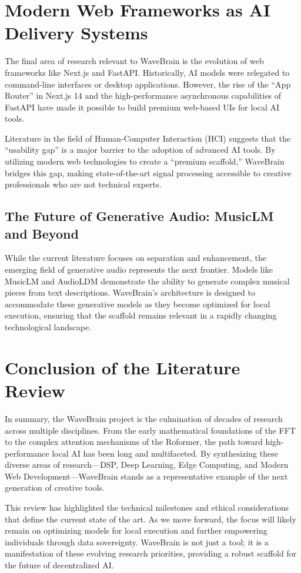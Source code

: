 \documentclass[12pt,a4paper]{article}
\begin{document}
\section{Modern Web Frameworks as AI Delivery Systems}
The final area of research relevant to WaveBrain is the evolution of web frameworks like Next.js and FastAPI. Historically, AI models were relegated to command-line interfaces or desktop applications. However, the rise of the ``App Router'' in Next.js 14 and the high-performance asynchronous capabilities of FastAPI have made it possible to build premium web-based UIs for local AI tools.

Literature in the field of Human-Computer Interaction (HCI) suggests that the ``usability gap'' is a major barrier to the adoption of advanced AI tools. By utilizing modern web technologies to create a ``premium scaffold,'' WaveBrain bridges this gap, making state-of-the-art signal processing accessible to creative professionals who are not technical experts.

\subsection{The Future of Generative Audio: MusicLM and Beyond}
While the current literature focuses on separation and enhancement, the emerging field of generative audio represents the next frontier. Models like MusicLM and AudioLDM demonstrate the ability to generate complex musical pieces from text descriptions. WaveBrain's architecture is designed to accommodate these generative models as they become optimized for local execution, ensuring that the scaffold remains relevant in a rapidly changing technological landscape.

\section{Conclusion of the Literature Review}
In summary, the WaveBrain project is the culmination of decades of research across multiple disciplines. From the early mathematical foundations of the FFT to the complex attention mechanisms of the Roformer, the path toward high-performance local AI has been long and multifaceted. By synthesizing these diverse areas of research---DSP, Deep Learning, Edge Computing, and Modern Web Development---WaveBrain stands as a representative example of the next generation of creative tools.

This review has highlighted the technical milestones and ethical considerations that define the current state of the art. As we move forward, the focus will likely remain on optimizing models for local execution and further empowering individuals through data sovereignty. WaveBrain is not just a tool; it is a manifestation of these evolving research priorities, providing a robust scaffold for the future of decentralized AI.

\newpage
\end{document}
